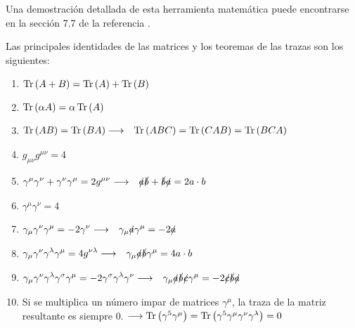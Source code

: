 Una demostración detallada de esta herramienta matemática puede encontrarse en la sección 7.7 de la referencia \cite{Griffiths2008}.

Las principales identidades de las matrices y los teoremas de las trazas son los siguientes:

\begin{enumerate}
\setlength{\itemsep}{0.2\baselineskip}
\item $\operatorname{Tr} \left(A+B\right)=\operatorname{Tr}\left( A\right)+\operatorname{Tr}\left( B\right)$
\item $\operatorname{Tr}\left( \alpha A\right) =\alpha \operatorname{Tr}\left( A\right)$
\item $\begin{aligned}[t]
\operatorname{Tr}\left(AB\right) &= \operatorname{Tr}\left( BA\right) \longrightarrow & \operatorname{Tr}\left( ABC\right) &=\operatorname{Tr}\left( CAB\right) =\operatorname{Tr}\left( BCA\right)
\end{aligned}$
\item $g_{\mu\nu}g^{\mu\nu}=4$
\item $\begin{aligned}[t]
\gamma ^{\mu }\gamma ^{\nu }+\gamma ^{\nu }\gamma ^{\mu } &= 2g^{\mu \nu } \longrightarrow & \slashed{a}\slashed{b}+\slashed{b}\slashed{a}&=2a\cdot b
\end{aligned}$
\item $\gamma ^{\mu }\gamma ^{\nu }=4$
\item $\begin{aligned}[t]
\gamma _{\mu }\gamma ^{\nu }\gamma ^{\mu } &= -2\gamma ^{\nu } \longrightarrow & \gamma _{\mu }\slashed{a}\gamma^{\mu } &= -2\slashed{a}
\end{aligned}$
\item $\begin{aligned}[t] 
\gamma _{\mu }\gamma ^{\nu }\gamma ^{\lambda }\gamma ^{\mu }&= 4g^{\nu\lambda } \longrightarrow & \gamma _{\mu }\slashed{a}\slashed{b}\gamma ^{\mu} &= 4a\cdot b \end{aligned}$
\item $\begin{aligned}[t] 
\gamma _{\mu }\gamma ^{\nu }\gamma ^{\lambda }\gamma ^{\sigma}\gamma ^{\mu }&=-2\gamma^{\sigma}\gamma ^{\lambda}\gamma ^{\nu} \longrightarrow & \gamma _{\mu }\slashed{a}\slashed{b}\slashed{c}\gamma ^{\mu} &= -2\slashed{c}\slashed{b}\slashed{a}\end{aligned}$
\item Si se multiplica un número impar de matrices $\gamma^{\mu}$, la traza de la matriz resultante es siempre 0. $ \longrightarrow \operatorname{Tr}\left( \gamma ^{5}\gamma ^{\mu }\right) =\operatorname{Tr}\left( \gamma ^{5}\gamma ^{\mu }\gamma ^{\nu }\gamma ^{\lambda }\right) =0$

\end{enumerate}
